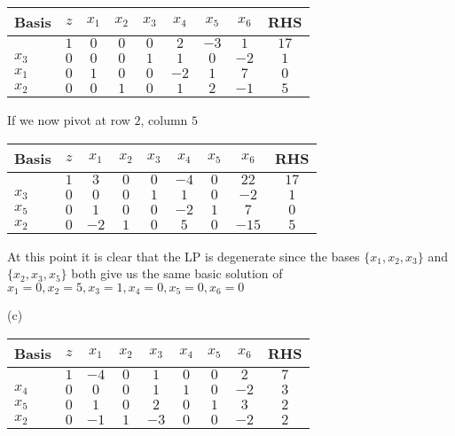 \documentclass{article}[12pt,a4paper]
\begin{document}
\begin{enumerate}
		\begin{center}
 		\begin{tabular}{l | c | c c c c c c | c}
             		Basis & $z$ & $x_1$ & $x_2$ & $x_3$ & $x_4$ & $x_5$ & $x_6$ & RHS \\ \hline
  			     & $1$ & $0$ & $0$   & $0$ & $2$  & $-3$     & $1$     & $17$  \\ \hline
  			$x_3$ & $0$ & $0$ & $0$   & $1$    & $1$      & $0$     & $-2$     & $1$ \\
  			$x_1$ & $0$ & $1$ & $0$  & $0$    & $-2$      & $1$     & $7$     & $0$ \\
  			$x_2$ & $0$ & $0$ & $1$ & $0$    & $1$      & $2$     & $-1$     & $5$ \\
  		\end{tabular}
  		\end{center}
  		
	If we now pivot at row $2$, column $5$
	
		\begin{center}
 		\begin{tabular}{l | c | c c c c c c | c}
             		Basis & $z$ & $x_1$ & $x_2$ & $x_3$ & $x_4$ & $x_5$ & $x_6$ & RHS \\ \hline
  			     & $1$ & $3$ & $0$   & $0$ & $-4$  & $0$     & $22$     & $17$  \\ \hline
  			$x_3$ & $0$ & $0$ & $0$   & $1$    & $1$      & $0$     & $-2$     & $1$ \\
  			$x_5$ & $0$ & $1$ & $0$  & $0$    & $-2$      & $1$     & $7$     & $0$ \\
  			$x_2$ & $0$ & $-2$ & $1$ & $0$    & $5$      & $0$     & $-15$     & $5$ \\
  		\end{tabular}
  		\end{center}
  		
	At this point it is clear that the LP is degenerate since the bases $\{x_1, x_2, x_3\}$ and $\{x_2, x_3, x_5\}$
	both give us the same basic solution of $x_1 = 0, x_2 = 5, x_3 = 1, x_4 = 0, x_5 = 0, x_6 = 0$ \newline
	\pagebreak
	
	(c)
  		\begin{center}
 		\begin{tabular}{l | c | c c c c c c | c}
             		Basis & $z$ & $x_1$ & $x_2$ & $x_3$ & $x_4$ & $x_5$ & $x_6$ & RHS \\ \hline
  			     & $1$ & $-4$ & $0$   & $1$ & $0$  & $0$     & $2$     & $7$  \\ \hline
  			$x_4$ & $0$ & $0$ & $0$   & $1$    & $1$      & $0$     & $-2$     & $3$ \\
  			$x_5$ & $0$ & $1$ & $0$  & $2$    & $0$      & $1$     & $3$     & $2$ \\
  			$x_2$ & $0$ & $-1$ & $1$ & $-3$    & $0$      & $0$     & $-2$     & $2$ \\
  		\end{tabular}
  		\end{center}
  		

\end{enumerate}
\end{document}
